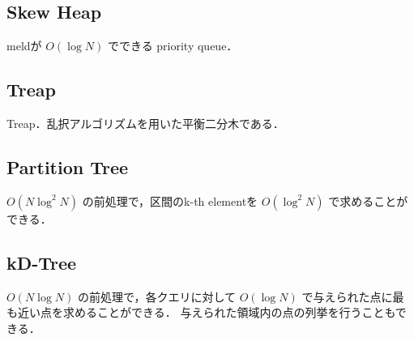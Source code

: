 \subsection{Skew Heap}
meldが $O(\log N)$ でできる priority queue．


\subsection{Treap}
Treap．乱択アルゴリズムを用いた平衡二分木である．


\subsection{Partition Tree}
$O(N \log^2 N)$ の前処理で，区間のk-th elementを $O(\log^2 N)$ で求めることができる．


\subsection{kD-Tree}
$O(N \log N)$ の前処理で，各クエリに対して $O(\log N)$ で与えられた点に最も近い点を求めることができる．
与えられた領域内の点の列挙を行うこともできる．

